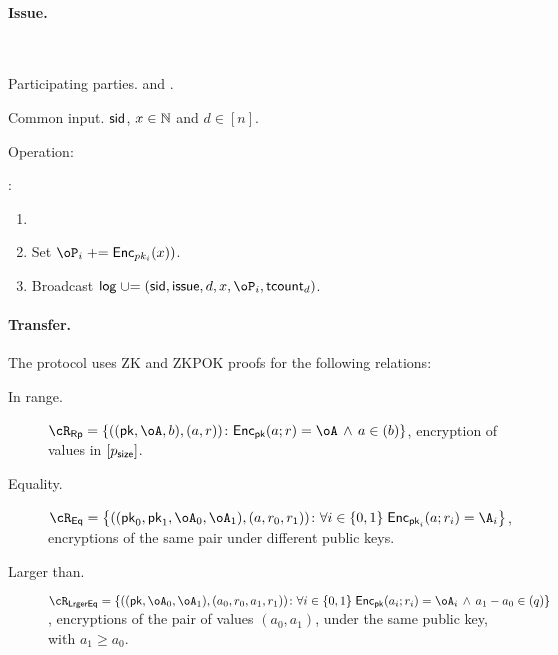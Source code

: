 \paragraph{Issue.}
\begin{protocol}~\label{prot:ConfidentialTransactions:Issue}
	\item[Participating parties.] \Ic and \Cc.
	
	
	
	\item[Common input.] $\mathsf{sid}$, $x\in {\mathbb{N}}$ and $d\in [n]$.
	
	\item[Operation:]  \Cc~
	
		\item \Cc:  
		\begin{enumerate}
			\item {}
			
			\item Set $\oP_i \pluseq \Enc_{pk_i}(x))$.
				
		\item Broadcast $\historylog \unioneq (\sid,\issue,d,x,\oP_i,\tcount_d)$.
				 	
		
	\end{enumerate}
\end{protocol}

\paragraph{Transfer.}

The protocol uses ZK and ZKPOK proofs for the   following  relations:

\begin{description}
	\item[In range.] $\rRp =\rRpDef$, \ie  encryption of values in $[p_{\mathsf{size}}]$.
	
	\item[Equality.] $\rEq =\rEqDef$, \ie  encryptions of the same pair under different public keys.
	
	\item[Larger than.] $\rLrgEq =\rLrgEqDef$, \ie encryptions of the  pair of values $(a_0,a_1)$, under the same public key, with $a_1 \ge a_0$.
\end{description}




